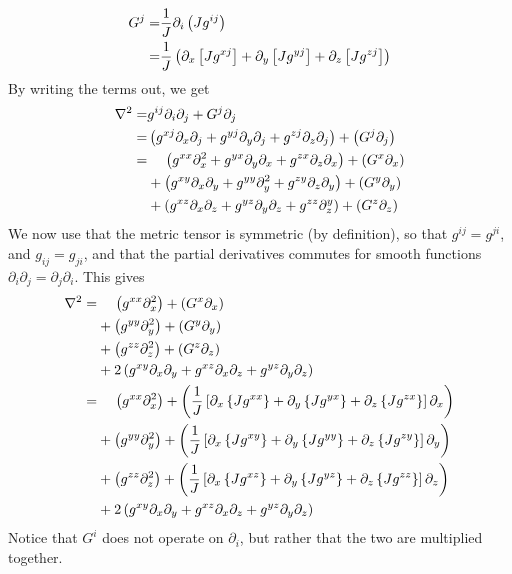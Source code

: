 %
\begin{align*}
    G^j =& \frac{1}{J} \partial_i \left(J g^{ij} \right)\\ =& \frac{1}{J} \left(
    \partial_x \left[J g^{xj} \right] + \partial_y \left[J g^{yj} \right] + \partial_z \left[J
    g^{zj} \right] \right)
\end{align*}
%
By writing the terms out, we get
%
\begin{align*}
    \grad^2 =& g^{ij} \partial_i \partial_j + G^j \partial_j\\
%
            =& \L(  g^{xj} \partial_x \partial_j + g^{yj} \partial_y \partial_j
    + g^{zj} \partial_z \partial_j\R) + \L(G^j \partial_j\R)\\
%
            =& \quad \, \L(  g^{xx} \partial_x^2 + g^{yx} \partial_y \partial_x
    + g^{zx} \partial_z \partial_x\R) + \L(G^x \partial_x\R)\\ &+ \L(  g^{xy}
    \partial_x \partial_y + g^{yy} \partial_y^2 + g^{zy} \partial_z
    \partial_y\R) + \L(G^y \partial_y\R)\\ &+ \L(  g^{xz} \partial_x \partial_z
    + g^{yz} \partial_y \partial_z + g^{zz} \partial_z^y\R) + \L(G^z
    \partial_z\R)
\end{align*}
%
We now use that the metric tensor is symmetric (by definition), so that $g^{ij}=g^{ji}$, and $g_{ij}=g_{ji}$, and that the partial derivatives commutes for smooth functions $\partial_i\partial_j=\partial_j\partial_i$.
This gives
%
\begin{align*}
    \grad^2 =&\quad \, \L(g^{xx} \partial_x^2 \R) + \L(G^x \partial_x\R)\\ &+
    \L(g^{yy} \partial_y^2 \R) + \L(G^y \partial_y\R)\\ &+ \L(g^{zz}
    \partial_z^2\R) + \L(G^z \partial_z\R)\\ &+ 2\L( g^{xy} \partial_x
    \partial_y + g^{xz} \partial_x \partial_z + g^{yz} \partial_y \partial_z
    \R)\\
%
           =&\quad \, \L(g^{xx} \partial_x^2\R) + \L( \frac{1}{J} \L[
\partial_x \L\{J g^{xx} \R\} + \partial_y \L\{J g^{yx} \R\} + \partial_z \L\{J
g^{zx} \R\} \R] \partial_x\R)\\ &+ \L(g^{yy} \partial_y^2\R) + \L( \frac{1}{J}
    \L[ \partial_x \L\{J g^{xy} \R\} + \partial_y \L\{J g^{yy} \R\} +
    \partial_z \L\{J g^{zy} \R\} \R] \partial_y\R)\\ &+ \L(g^{zz}
        \partial_z^2\R) + \L( \frac{1}{J} \L[ \partial_x \L\{J g^{xz} \R\} +
        \partial_y \L\{J g^{yz} \R\} + \partial_z \L\{J g^{zz} \R\} \R]
        \partial_z\R)\\ &+ 2\L( g^{xy} \partial_x \partial_y + g^{xz}
        \partial_x \partial_z + g^{yz} \partial_y \partial_z \R)
\end{align*}
%
Notice that $G^i$ does not operate on $\partial_i$, but rather that the two are
multiplied together.


